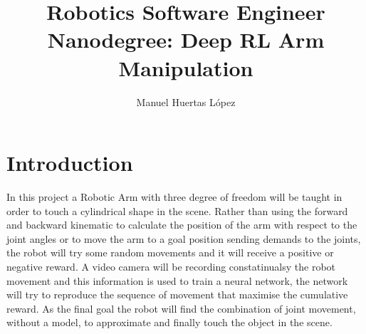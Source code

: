 \documentclass[10pt,journal,compsoc]{IEEEtran}
\begin{document}
\title{Robotics Software Engineer Nanodegree: Deep RL Arm Manipulation}
\author{Manuel Huertas L\'opez}

%
{}


\maketitle
\IEEEdisplaynontitleabstractindextext
\IEEEpeerreviewmaketitle
\section{Introduction}

In this project a Robotic Arm with three degree of freedom will be taught in order to touch a cylindrical shape in the scene. Rather than using the forward and backward kinematic to calculate the position of the arm with respect to the joint angles or to move the arm to a goal position sending demands to the joints, the robot will try some random movements and it will receive a positive or negative reward. A video camera will be recording constatinualsy the robot movement and this information is used to train a neural network, the network will try to reproduce the sequence of movement that maximise the cumulative reward. As the final goal the robot will find the combination of joint movement, without a model, to approximate and finally touch the object in the scene.
\end{document}
